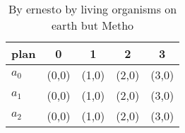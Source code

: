\documentclass[a4paper]{article}
\begin{document}
\begin{table}
\begin{adjustbox}{width=0.6\columnwidth}
\begin{tabular}{|l|l|l|l|l|}
\hline
\textbf{plan} & \multicolumn{1}{c|}{\textbf{0}} & \multicolumn{1}{c|}{\textbf{1}} & \multicolumn{1}{c|}{\textbf{2}} & \multicolumn{1}{c|}{\textbf{3}} \\ \hline
\textbf{$a_0$}  & (0,0) & (1,0) & (2,0) & (3,0) \\ \hline
\textbf{$a_1$}  & (0,0) & (1,0) & (2,0) & (3,0) \\ \hline
\textbf{$a_2$}  & (0,0) & (1,0) & (2,0) & (3,0) \\ \hline
\end{tabular}
\end{adjustbox}
\caption{By ernesto by living organisms on earth but Metho
}
\end{table}
\end{document}
